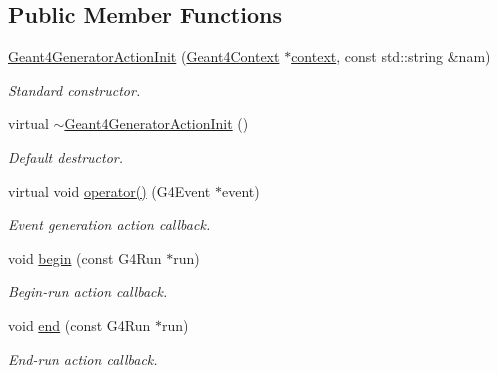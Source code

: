 \subsection*{Public Member Functions}
\begin{DoxyCompactItemize}
\item 
\hyperlink{class_d_d4hep_1_1_simulation_1_1_geant4_generator_action_init_a33f6258e3b8c24b7ccc09ee2a107e6d7}{Geant4\+Generator\+Action\+Init} (\hyperlink{class_d_d4hep_1_1_simulation_1_1_geant4_context}{Geant4\+Context} $\ast$\hyperlink{class_d_d4hep_1_1_simulation_1_1_geant4_action_aa9d87f0ec2a72b7fc2591b18f98d75cf}{context}, const std\+::string \&nam)
\begin{DoxyCompactList}\small\item\em Standard constructor. \end{DoxyCompactList}\item 
virtual \hyperlink{class_d_d4hep_1_1_simulation_1_1_geant4_generator_action_init_a8e406b069d1024eb9891cbb979c5a734}{$\sim$\+Geant4\+Generator\+Action\+Init} ()
\begin{DoxyCompactList}\small\item\em Default destructor. \end{DoxyCompactList}\item 
virtual void \hyperlink{class_d_d4hep_1_1_simulation_1_1_geant4_generator_action_init_adbcf087dfc4c0ac510b102dfd1f838b0}{operator()} (G4\+Event $\ast$event)
\begin{DoxyCompactList}\small\item\em Event generation action callback. \end{DoxyCompactList}\item 
void \hyperlink{class_d_d4hep_1_1_simulation_1_1_geant4_generator_action_init_a7f4d99a8f94977444775eabea8080868}{begin} (const G4\+Run $\ast$run)
\begin{DoxyCompactList}\small\item\em Begin-\/run action callback. \end{DoxyCompactList}\item 
void \hyperlink{class_d_d4hep_1_1_simulation_1_1_geant4_generator_action_init_aa3b0b224ed839f32af03507be13267a8}{end} (const G4\+Run $\ast$run)
\begin{DoxyCompactList}\small\item\em End-\/run action callback. \end{DoxyCompactList}\end{DoxyCompactItemize}
